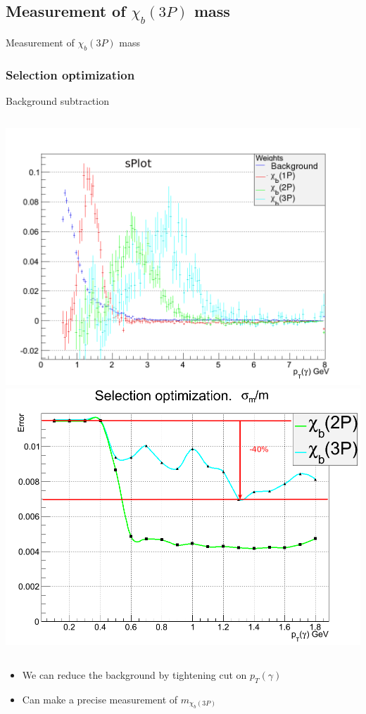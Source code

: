 \documentclass{beamer}
\begin{document}
\subsection{Measurement of $\chi_{b}(3P)$ mass}
\begin{frame}
\begin{exampleblock}{}
    \begin{center}
        {\huge Measurement of $\chi_{b}(3P)$ mass}
    \end{center}
\end{exampleblock}
\end{frame}
\begin{frame}
\frametitle{Selection optimization}
Background subtraction
\begin{columns}[c]
\includegraphics[width=\textwidth]{images/splot.png}
\includegraphics[width=\textwidth]{images/plot_rerr_m3p.png}
\end{columns}
\begin{itemize}
  \item We can reduce the background by tightening cut on $p_T(\gamma)$
  \item Can make a precise measurement of $m_{\chi_b(3P)}$
\end{itemize}
\end{frame}
\end{document}
